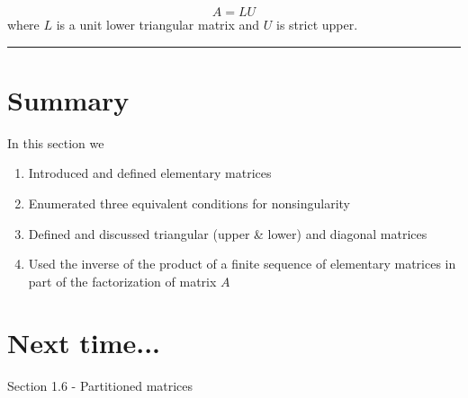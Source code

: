 	 \[   A = LU \]
	 where $L$ is a unit lower triangular matrix and $U$ is strict upper.  

\rule[0.01in]{\textwidth}{0.0025in}








\section*{Summary}


 In this section we 
\begin{enumerate}
	\item Introduced and defined elementary matrices
	\item Enumerated three equivalent conditions for nonsingularity 
	\item Defined and discussed triangular (upper \& lower) and diagonal matrices
	\item Used the inverse of the product of a finite sequence of elementary matrices in part of the factorization of matrix $A$ 
	
	
\end{enumerate}
 



\section*{Next time...}
Section 1.6 - Partitioned matrices

